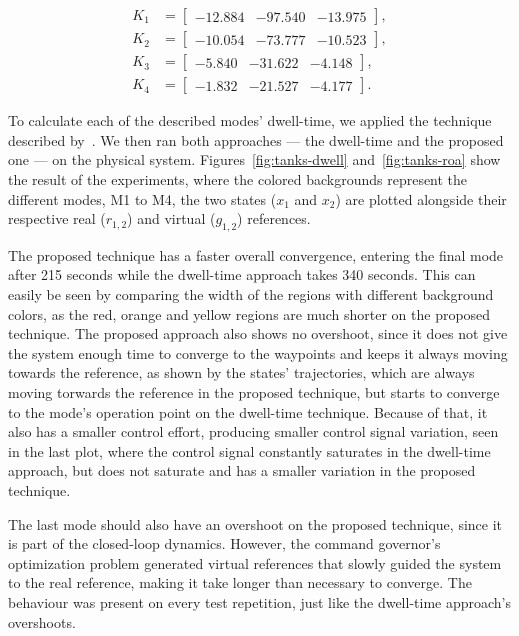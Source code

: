 \begin{align}
  K_{1} & = \begin{bmatrix} -12.884 & -97.540 & -13.975 \end{bmatrix}, \\
  K_{2} & = \begin{bmatrix} -10.054 & -73.777 & -10.523 \end{bmatrix}, \\
  K_{3} & = \begin{bmatrix} -5.840  & -31.622 & -4.148 \end{bmatrix}, \\
  K_{4} & = \begin{bmatrix} -1.832  & -21.527 & -4.177 \end{bmatrix}.
\end{align}

To calculate each of the described modes' dwell-time, we applied the technique
described by~\textcite{franzè.lucia.ea:command}. We then ran both approaches ---
the dwell-time and the proposed one --- on the physical system.
Figures~\ref{fig:tanks-dwell} and~\ref{fig:tanks-roa} show the result of the
experiments, where the colored backgrounds represent the different modes, M1 to
M4, the two states (\(x_{1}\) and \(x_{2}\)) are plotted alongside their
respective real (\(r_{1,2}\)) and virtual (\(g_{1,2}\)) references.

The proposed technique has a faster overall convergence, entering the final mode
after 215 seconds while the dwell-time approach takes 340 seconds. This can
easily be seen by comparing the width of the regions with different background
colors, as the red, orange and yellow regions are much shorter on the proposed
technique. The proposed approach also shows no overshoot, since it does not give
the system enough time to converge to the waypoints and keeps it always moving
towards the reference, as shown by the states' trajectories, which are always
moving torwards the reference in the proposed technique, but starts to converge
to the mode's operation point on the dwell-time technique. Because of that, it
also has a smaller control effort, producing smaller control signal variation,
seen in the last plot, where the control signal constantly saturates in the
dwell-time approach, but does not saturate and has a smaller variation in the
proposed technique.

The last mode should also have an overshoot on the proposed technique, since it
is part of the closed-loop dynamics. However, the command governor's
optimization problem generated virtual references that slowly guided the system
to the real reference, making it take longer than necessary to converge. The
behaviour was present on every test repetition, just like the dwell-time
approach's overshoots.

